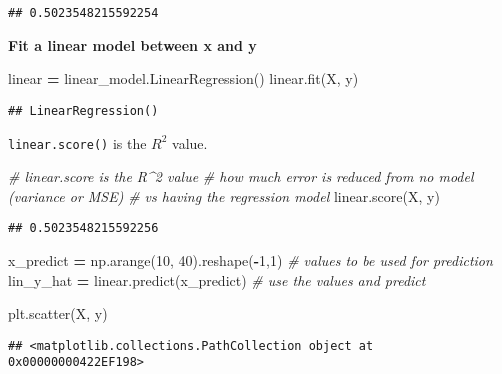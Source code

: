\documentclass[
]{book}
\newenvironment{Shaded}{\begin{snugshade}}{\end{snugshade}}
\newcommand{\CommentTok}[1]{\textcolor[rgb]{0.56,0.35,0.01}{\textit{#1}}}
\newcommand{\DecValTok}[1]{\textcolor[rgb]{0.00,0.00,0.81}{#1}}
\newcommand{\NormalTok}[1]{#1}
\newcommand{\OperatorTok}[1]{\textcolor[rgb]{0.81,0.36,0.00}{\textbf{#1}}}
\begin{document}
\begin{verbatim}
## 0.5023548215592254
\end{verbatim}

\textbf{Fit a linear model between x and y}

\begin{Shaded}
\begin{Highlighting}[]
\NormalTok{linear }\OperatorTok{=}\NormalTok{ linear\_model.LinearRegression()}
\NormalTok{linear.fit(X, y)}
\end{Highlighting}
\end{Shaded}

\begin{verbatim}
## LinearRegression()
\end{verbatim}

\texttt{linear.score()} is the \(R^2\) value.

\begin{Shaded}
\begin{Highlighting}[]
\CommentTok{\# linear.score is the R\^{}2 value}
\CommentTok{\# how much error is reduced from no model (variance or MSE)}
\CommentTok{\# vs having the regression model}
\NormalTok{linear.score(X, y)}
\end{Highlighting}
\end{Shaded}

\begin{verbatim}
## 0.5023548215592256
\end{verbatim}

\begin{Shaded}
\begin{Highlighting}[]
\NormalTok{x\_predict }\OperatorTok{=}\NormalTok{ np.arange(}\DecValTok{10}\NormalTok{, }\DecValTok{40}\NormalTok{).reshape(}\OperatorTok{{-}}\DecValTok{1}\NormalTok{,}\DecValTok{1}\NormalTok{) }\CommentTok{\# values to be used for prediction}
\NormalTok{lin\_y\_hat }\OperatorTok{=}\NormalTok{ linear.predict(x\_predict) }\CommentTok{\# use the values and predict}
\end{Highlighting}
\end{Shaded}

\begin{Shaded}
\begin{Highlighting}[]
\NormalTok{plt.scatter(X, y)}
\end{Highlighting}
\end{Shaded}

\begin{verbatim}
## <matplotlib.collections.PathCollection object at 0x00000000422EF198>
\end{verbatim}
\end{document}
